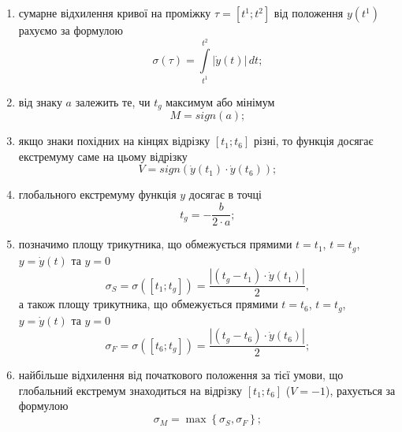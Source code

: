 \begin{enumerate}
  \item
    сумарне відхилення кривої на проміжку $\tau = \left[ t^1; t^2 \right]$ від
    положення $y\left( t^1 \right)$ рахуємо за формулою
    \begin{equation*}
      \sigma\left( \tau \right)
      = \int\limits_{t^1}^{t^2} \left| \dot{y}\left( t \right) \right| \, dt;
    \end{equation*}
  \item
    від знаку $a$ залежить те, чи $t_g$ максимум або мінімум
    \begin{equation*}
      M = sign\left( a \right); %
    \end{equation*}
  \item
    якщо знаки похідних на кінцях відрізку $\left[ t_1; t_6 \right]$ різні,
    то функція досягає екстремуму саме на цьому відрізку
    \begin{equation*}
      V %
      = sign\left( \dot{y}\left( t_1 \right) \cdot \dot{y}\left( t_6 \right) \right);
    \end{equation*}
  \item 
    глобального екстремуму функція $y$ досягає в точці
    \begin{equation*}
      t_g = - \frac{b}{2 \cdot a}; %
    \end{equation*}
  \item
    позначимо площу трикутника, що обмежується прямими
    $t=t_1$, $t=t_g$, $y=\dot{y}\left( t \right)$ та $y=0$
    \begin{equation*}
      \sigma_S %
      = \sigma\left( \left[ t_1; t_g \right] \right)
      = \frac{\left| \left( t_g - t_1 \right) \cdot \dot{y}\left( t_1 \right) \right|}{2},
    \end{equation*}
    а також площу трикутника, що обмежується прямими
    $t=t_6$, $t=t_g$, $y=\dot{y}\left( t \right)$ та $y=0$
    \begin{equation*}
      \sigma_F %
      = \sigma\left( \left[ t_6; t_g \right] \right)
      = \frac{\left| \left( t_g - t_6 \right) \cdot \dot{y}\left( t_6 \right) \right|}{2};
    \end{equation*}
  \item
    найбільше відхилення від початкового положення за тієї умови,
    що глобальний екстремум знаходиться на відрізку
    $\left[ t_1; t_6 \right]$ ($V=-1$), рахується за формулою
    \begin{equation*}
      \sigma_M = \max{\left\{ \sigma_S, \sigma_F \right\}}; %

\end{equation*}
\end{enumerate}
